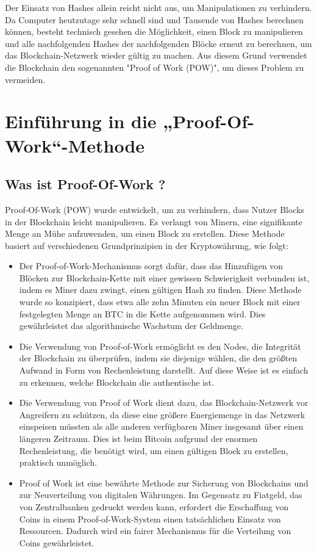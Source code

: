\documentclass[ngerman]{scrreprt}
\begin{document}
Der Einsatz von Hashes allein reicht nicht aus, um Manipulationen zu verhindern. Da Computer heutzutage sehr schnell sind und Tausende von Hashes berechnen können, besteht technisch gesehen die Möglichkeit, einen Block zu manipulieren und alle nachfolgenden Hashes der nachfolgenden Blöcke erneut zu berechnen, um das Blockchain-Netzwerk wieder gültig zu machen. Aus diesem Grund verwendet die Blockchain den sogenannten "Proof of Work (POW)", um dieses Problem zu vermeiden.	



\chapter[Theoretische Seite der Proof-Of-Work-Methode]{Einführung in die „Proof-Of-Work“-Methode}	

\section{Was ist Proof-Of-Work ?}
Proof-Of-Work (POW) wurde entwickelt, um zu verhindern, dass Nutzer Blocks in der Blockchain leicht manipulieren. Es verlangt von Minern, eine signifikante Menge an Mühe aufzuwenden, um einen Block zu erstellen. Diese Methode basiert auf verschiedenen Grundprinzipien in der Kryptowährung, wie folgt:

\begin{itemize}
	\item{Der Proof-of-Work-Mechanismus sorgt dafür, dass das Hinzufügen von Blöcken zur Blockchain-Kette mit einer gewissen Schwierigkeit verbunden ist, indem es Miner dazu zwingt, einen gültigen Hash zu finden. Diese Methode wurde so konzipiert, dass etwa alle zehn Minuten ein neuer Block mit einer festgelegten Menge an BTC in die Kette aufgenommen wird. Dies gewährleistet das algorithmische Wachstum der Geldmenge.}
	\item{Die Verwendung von Proof-of-Work ermöglicht es den Nodes, die Integrität der Blockchain zu überprüfen, indem sie diejenige wählen, die den größten Aufwand in Form von Rechenleistung darstellt. Auf diese Weise ist es einfach zu erkennen, welche Blockchain die authentische ist.}
	\item{Die Verwendung von Proof of Work dient dazu, das Blockchain-Netzwerk vor Angreifern zu schützen, da diese eine größere Energiemenge in das Netzwerk einspeisen müssten als alle anderen verfügbaren Miner insgesamt über einen längeren Zeitraum. Dies ist beim Bitcoin aufgrund der enormen Rechenleistung, die benötigt wird, um einen gültigen Block zu erstellen, praktisch unmöglich.}
	\item{Proof of Work ist eine bewährte Methode zur Sicherung von Blockchains und zur Neuverteilung von digitalen Währungen. Im Gegensatz zu Fiatgeld, das von Zentralbanken gedruckt werden kann, erfordert die Erschaffung von Coins in einem Proof-of-Work-System einen tatsächlichen Einsatz von Ressourcen. Dadurch wird ein fairer Mechanismus für die Verteilung von Coins gewährleistet.}
\end{itemize}
\end{document}
